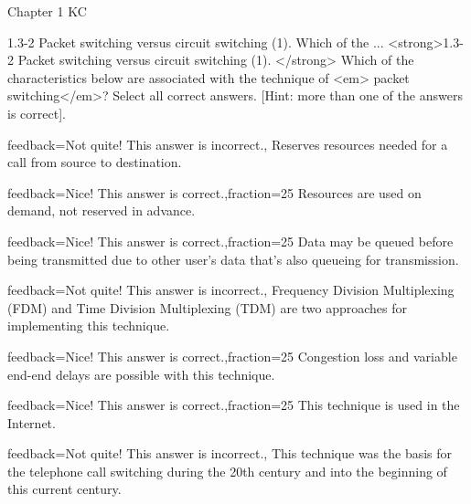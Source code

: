 \documentclass[a4paper]{article}
\begin{document}
\begin{quiz}{Chapter 1 KC}
\begin{multi}[points=1,multiple]{1.3-2 Packet switching versus circuit switching (1).  Which of the ...}
<strong>1.3-2 Packet switching versus circuit switching (1). </strong> Which of the characteristics below are associated with the technique of <em> packet switching</em>? Select all correct answers. [Hint: more than one of the answers is correct].
\item[feedback={Not quite! This answer is incorrect.},] Reserves resources needed for a call from source to destination.
\item[feedback={Nice! This answer is correct.},fraction=25] Resources are used on demand, not reserved in advance.
\item[feedback={Nice! This answer is correct.},fraction=25] Data may be queued before being transmitted due to other user’s data that’s also queueing for transmission.
\item[feedback={Not quite! This answer is incorrect.},] Frequency Division Multiplexing (FDM) and Time Division Multiplexing (TDM) are two approaches for implementing this technique.
\item[feedback={Nice! This answer is correct.},fraction=25] Congestion loss and variable end-end delays are possible with this technique.
\item[feedback={Nice! This answer is correct.},fraction=25] This technique is used in the Internet.
\item[feedback={Not quite! This answer is incorrect.},] This technique was the basis for the telephone call switching during the 20th century and into the beginning of this current century.
\end{multi}


\end{quiz}
\end{document}

